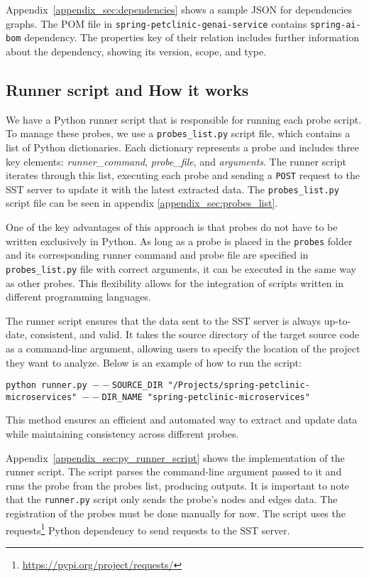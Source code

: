 \sloppy
Appendix~\ref{appendix_sec:dependencies} shows a sample JSON for dependencies graphs. The POM file in \texttt{spring-petclinic-genai-service} contains \texttt{spring-ai-bom} dependency. The properties key of their relation includes further information about the dependency, showing its version, scope, and type.

\subsection{Runner script and How it works}

We have a Python runner script that is responsible for running each probe script. To manage these probes, we use a \texttt{probes\_list.py} script file, which contains a list of Python dictionaries. Each dictionary represents a probe and includes three key elements: \textit{runner\_command}, \textit{probe\_file}, and \textit{arguments}. The runner script iterates through this list, executing each probe and sending a \texttt{POST} request to the SST server to update it with the latest extracted data. The \texttt{probes\_list.py} script file can be seen in appendix \autoref{appendix_sec:probes_list}.

One of the key advantages of this approach is that probes do not have to be written exclusively in Python. As long as a probe is placed in the \texttt{probes} folder and its corresponding runner command and probe file are specified in \texttt{probes\_list.py} file with correct arguments, it can be executed in the same way as other probes. This flexibility allows for the integration of scripts written in different programming languages.  

The runner script ensures that the data sent to the SST server is always up-to-date, consistent, and valid. It takes the source directory of the target source code as a command-line argument, allowing users to specify the location of the project they want to analyze. Below is an example of how to run the script:

\begin{tcolorbox}[colback=gray!5, colframe=gray!20]
    \texttt{python runner.py \newline ${--}$SOURCE\_DIR "/Projects/spring-petclinic-microservices" \newline ${--}$DIR\_NAME "spring-petclinic-microservices"}
\end{tcolorbox}

This method ensures an efficient and automated way to extract and update data while maintaining consistency across different probes.

Appendix~\ref{appendix_sec:py_runner_script} shows the implementation of the runner script. The script parses the command-line argument passed to it and runs the probe from the probes list, producing outputs. It is important to note that the \texttt{runner.py} script only sends the probe's nodes and edges data. The registration of the probes must be done manually for now. The script uses the requests\footnote{\url{https://pypi.org/project/requests/}} Python dependency to send requests to the SST server.